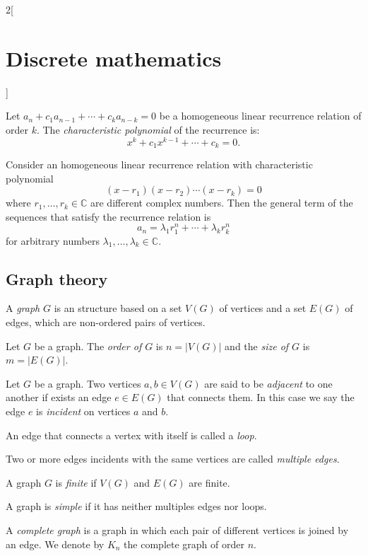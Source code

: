 \documentclass[class=article,10pt,crop=false]{standalone}
\begin{document}
\begin{multicols}{2}[\section{Discrete mathematics}]
\begin{definition}
Let $a_n+c_1a_{n-1}+\cdots+c_ka_{n-k}=0$ be a homogeneous linear recurrence relation of order $k$. The \textit{characteristic polynomial} of the recurrence is: $$x^k+c_1x^{k-1}+\cdots+c_k=0.$$
\end{definition}
\begin{prop}
Consider an homogeneous linear recurrence relation with characteristic polynomial $$(x-r_1)(x-r_2)\cdots(x-r_k)=0$$ where $r_1,\ldots,r_k\in\mathbb{C}$ are different complex numbers. Then the general term of the sequences that satisfy the recurrence relation is $$a_n=\lambda_1r_1^n+\cdots+\lambda_kr_k^n$$ for arbitrary numbers $\lambda_1,\ldots,\lambda_k\in\mathbb{C}$.
\end{prop}
\subsection{Graph theory}
\begin{definition}
A \textit{graph} $G$ is an structure based on a set $V(G)$ of vertices and a set $E(G)$ of edges, which are non-ordered pairs of vertices.
\end{definition}
\begin{definition}
Let $G$ be a graph. The \textit{order of $G$} is $n=|V(G)|$ and the \textit{size of $G$} is $m=|E(G)|$.
\end{definition}
\begin{definition}
Let $G$ be a graph. Two vertices $a,b\in V(G)$ are said to be \textit{adjacent} to one another if exists an edge $e\in E(G)$ that connects them. In this case we say the edge $e$ is \textit{incident} on vertices $a$ and $b$.
\end{definition}
\begin{definition}
An edge that connects a vertex with itself is called a \textit{loop}.
\end{definition}
\begin{definition}
Two or more edges incidents with the same vertices are called \textit{multiple edges}.
\end{definition}
\begin{definition}
A graph $G$ is \textit{finite} if $V(G)$ and $E(G)$ are finite.
\end{definition}
\begin{definition}
A graph is \textit{simple} if it has neither multiples edges nor loops.
\end{definition}
\begin{definition}
A \textit{complete graph} is a graph in which each pair of different vertices is joined by an edge. We denote by $K_n$ the complete graph of order $n$.

\end{definition}
\end{multicols}
\end{document}
